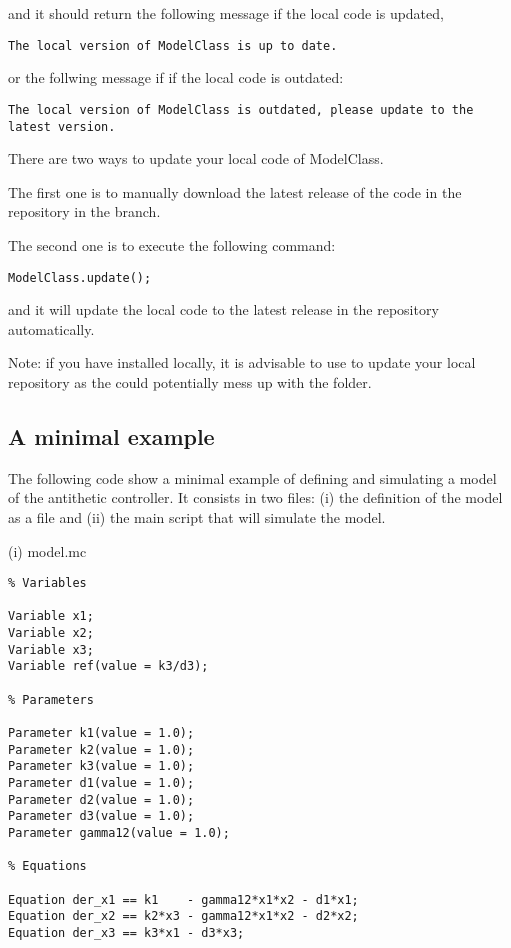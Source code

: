 \documentclass[11pt]{article}
\begin{document}
and it should return the following message if the local code is updated,

\begin{lstlisting}
The local version of ModelClass is up to date.
\end{lstlisting}

or the follwing message if if the local code is outdated:

\begin{lstlisting}
The local version of ModelClass is outdated, please update to the latest version.
\end{lstlisting}

There are two ways to update your local code of ModelClass.

The first one is to manually download the latest release of the code in the repository in the  branch.

The second one is to execute the following command:

\begin{lstlisting}
ModelClass.update();
\end{lstlisting}

and it will update the local code to the latest release in the repository automatically. 

Note: if you have  installed locally, it is advisable to use  to update your local repository as the  could potentially mess up with the  folder.

\subsection{A minimal example}

The following code show a minimal example of defining and simulating a model of the antithetic controller. It consists in two files: (i) the definition of the model as a  file and (ii) the main script that will simulate the model. 

(i) model.mc 

\begin{lstlisting}
% Variables

Variable x1;
Variable x2;
Variable x3;
Variable ref(value = k3/d3);

% Parameters

Parameter k1(value = 1.0);
Parameter k2(value = 1.0);
Parameter k3(value = 1.0);
Parameter d1(value = 1.0);
Parameter d2(value = 1.0);
Parameter d3(value = 1.0);
Parameter gamma12(value = 1.0);

% Equations

Equation der_x1 == k1    - gamma12*x1*x2 - d1*x1;
Equation der_x2 == k2*x3 - gamma12*x1*x2 - d2*x2;
Equation der_x3 == k3*x1 - d3*x3;
\end{lstlisting}
\end{document}
